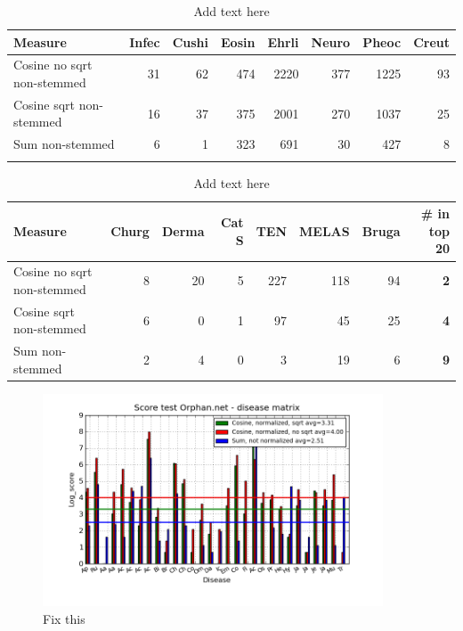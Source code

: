 \begin{table}[H]
  \begin{tiny}
  \caption{Add text here}
  \label{testResult}
  \begin{tabular}{|l|r|r|r|r|r|r|r|}
    \hline
    Measure &Infec&Cushi&Eosin&Ehrli&Neuro&Pheoc&Creut \\
    \hline
    Cosine no sqrt non-stemmed &31&62&474&2220&377&1225&93 \\
    \hline
    Cosine sqrt non-stemmed &16&37&375&2001&270&1037&25 \\
    \hline
    Sum non-stemmed &6&1&323&691&30&427&8  \\
    \hline
  \multicolumn{8}{c}{} \\
  \end{tabular}
  \begin{tabular}{|l|r|r|r|r|r|r|r|}
    \hline
    Measure &Churg&Derma&Cat S&TEN&MELAS&Bruga& \scriptsize{\textbf{\# in top 20}} \\
    \hline
    Cosine no sqrt non-stemmed &8&20&5&227&118&94 &\scriptsize{\textbf{2}} \\
    \hline
    Cosine sqrt non-stemmed &6&0&1&97&45&25 &  \scriptsize{\textbf{4}}\\
    \hline
    Sum non-stemmed &2&4&0&3&19&6 & \scriptsize{\textbf{9}} \\
    \hline
  \end{tabular}
  \end{tiny}
\end{table}

\begin{figure}[H]
        \begin{center}
          \includegraphics[width=0.9\textwidth]{barcharts/diseaseMatrix_orphan_hist_NOTnorm_3000_ns_cos_sqrt_cos_sum_nn.png}
        \end{center}
        \caption{Fix this}
        \label{diseaseMatrix_orphan_hist_NOTnorm_3000_ns_cos_sqrt_cos_sum_nn}
\end{figure}

